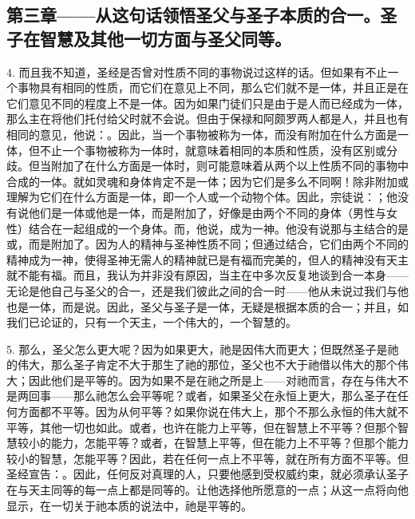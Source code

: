 
\subsection{第三章——从这句话领悟圣父与圣子本质的合一。圣子在智慧及其他一切方面与圣父同等。}

4. 而且我不知道，圣经是否曾对性质不同的事物说过这样的话。但如果有不止一个事物具有相同的性质，而它们在意见上不同，那么它们就不是一体，并且正是在它们意见不同的程度上不是一体。因为如果门徒们只是由于是人而已经成为一体，那么主在将他们托付给父时就不会说。但由于保禄和阿颇罗两人都是人，并且也有相同的意见，他说：。因此，当一个事物被称为一体，而没有附加在什么方面是一体，但不止一个事物被称为一体时，就意味着相同的本质和性质，没有区别或分歧。但当附加了在什么方面是一体时，则可能意味着从两个以上性质不同的事物中合成的一体。就如灵魂和身体肯定不是一体；因为它们是多么不同啊！除非附加或理解为它们在什么方面是一体，即一个人或一个动物个体。因此，宗徒说：；他没有说他们是一体或他是一体，而是附加了，好像是由两个不同的身体（男性与女性）结合在一起组成的一个身体。而，他说，成为一神。他没有说那与主结合的是或，而是附加了。因为人的精神与圣神性质不同；但通过结合，它们由两个不同的精神成为一神，使得圣神无需人的精神就已是有福而完美的，但人的精神没有天主就不能有福。而且，我认为并非没有原因，当主在中多次反复地谈到合一本身——无论是他自己与圣父的合一，还是我们彼此之间的合一时——他从未说过我们与他也是一体，而是说。因此，圣父与圣子是一体，无疑是根据本质的合一；并且，如我们已论证的，只有一个天主，一个伟大的，一个智慧的。\par

5. 那么，圣父怎么更大呢？因为如果更大，祂是因伟大而更大；但既然圣子是祂的伟大，那么圣子肯定不大于那生了祂的那位，圣父也不大于祂借以伟大的那个伟大；因此他们是平等的。因为如果不是在祂之所是上——对祂而言，存在与伟大不是两回事——那么祂怎么会平等呢？或者，如果圣父在永恒上更大，那么圣子在任何方面都不平等。因为从何平等？如果你说在伟大上，那个不那么永恒的伟大就不平等，其他一切也如此。或者，也许在能力上平等，但在智慧上不平等？但那个智慧较小的能力，怎能平等？或者，在智慧上平等，但在能力上不平等？但那个能力较小的智慧，怎能平等？因此，若在任何一点上不平等，就在所有方面不平等。但圣经宣告：。因此，任何反对真理的人，只要他感到受权威约束，就必须承认圣子在与天主同等的每一点上都是同等的。让他选择他所愿意的一点；从这一点将向他显示，在一切关于祂本质的说法中，祂是平等的。\par

